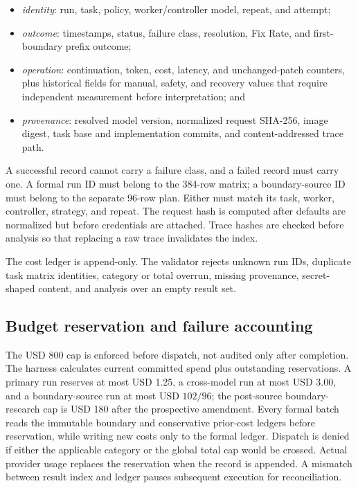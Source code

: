 \begin{itemize}[leftmargin=*]
  \item \emph{identity}: run, task, policy, worker/controller model, repeat, and attempt;
  \item \emph{outcome}: timestamps, status, failure class, resolution, Fix Rate, and first-boundary prefix outcome;
  \item \emph{operation}: continuation, token, cost, latency, and unchanged-patch counters, plus historical fields for manual, safety, and recovery values that require independent measurement before interpretation; and
  \item \emph{provenance}: resolved model version, normalized request SHA-256, image digest, task base and implementation commits, and content-addressed trace path.
\end{itemize}

A successful record cannot carry a failure class, and a failed record must carry one. A formal run ID must belong to the 384-row matrix; a boundary-source ID must belong to the separate 96-row plan. Either must match its task, worker, controller, strategy, and repeat. The request hash is computed after defaults are normalized but before credentials are attached. Trace hashes are checked before analysis so that replacing a raw trace invalidates the index.

The cost ledger is append-only. The validator rejects unknown run IDs, duplicate task matrix identities, category or total overrun, missing provenance, secret-shaped content, and analysis over an empty result set.

\subsection{Budget reservation and failure accounting}

The USD 800 cap is enforced before dispatch, not audited only after completion. The harness calculates current committed spend plus outstanding reservations. A primary run reserves at most USD 1.25, a cross-model run at most USD 3.00, and a boundary-source run at most USD $102/96$; the post-source boundary-research cap is USD 180 after the prospective amendment. Every formal batch reads the immutable boundary and conservative prior-cost ledgers before reservation, while writing new costs only to the formal ledger. Dispatch is denied if either the applicable category or the global total cap would be crossed. Actual provider usage replaces the reservation when the record is appended. A mismatch between result index and ledger pauses subsequent execution for reconciliation.

